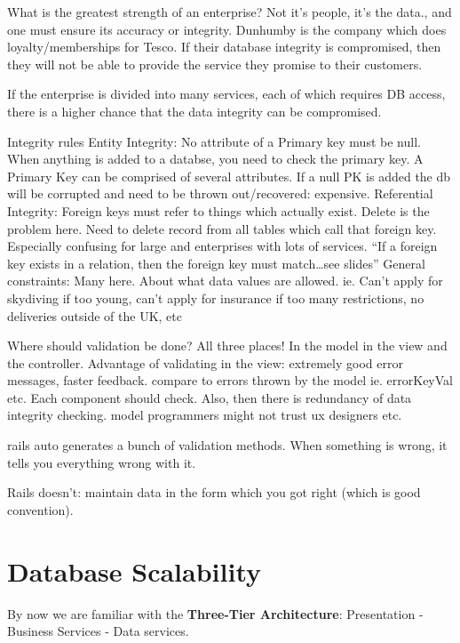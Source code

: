 \documentclass[11pt]{article}
\begin{document}
What is the greatest strength of an enterprise? Not it’s people, it’s the data., and one must ensure its accuracy or integrity. Dunhumby is the company which does loyalty/memberships for Tesco. If their database integrity is compromised, then they will not be able to provide the service they promise to their customers.

If the enterprise is divided into many services, each of which requires DB access, there is a higher chance that the data integrity can be compromised.

Integrity rules
Entity Integrity: No attribute of a Primary key must be null. When anything is added to a databse, you need to check the primary key. A Primary Key can be comprised of several attributes. If a null PK is added the db will be corrupted and need to be thrown out/recovered: expensive.
Referential Integrity: Foreign keys must refer to things which actually exist. Delete is the problem here. Need to delete record from all tables which call that foreign key. Especially confusing for large and enterprises with lots of services. “If a foreign key exists in a relation, then the foreign key must match…see slides”
General constraints: Many here. About what data values are allowed. ie. Can’t apply for skydiving if too young, can’t apply for insurance if too many restrictions, no deliveries outside of the UK, etc

Where should validation be done?
All three places! In the model in the view and the controller. Advantage of validating in the view: extremely good error messages, faster feedback. compare to errors thrown by the model ie. errorKeyVal etc. Each component should check. Also, then there is redundancy of data integrity checking. model programmers might not trust ux designers etc.

rails auto generates a bunch of validation methods. When something is wrong, it tells you everything wrong with it.

Rails doesn’t: maintain data in the form  which you got right (which is good convention).


\section{Database Scalability}

By now we are familiar with the \textbf{Three-Tier Architecture}: Presentation - Business Services - Data services.
\end{document}
